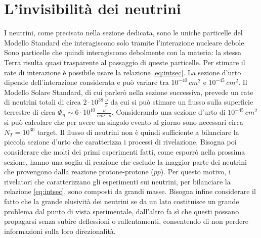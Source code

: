 \section{L'invisibilità dei neutrini}
I neutrini, come precisato nella sezione dedicata, sono le uniche particelle del Modello Standard che interagiscono solo tramite l'interazione nucleare debole. Sono particelle che quindi interagiscono debolmente con la materia: la stessa Terra risulta quasi trasparente al passaggio di queste particelle. Per stimare il rate di interazione è possibile usare la relazione \ref{eq:intsec}. La sezione d'urto dipende dell'interazione considerata e può variare tra $10^{-40}\,\unit{cm}^2$ e $10^{-45}\,\unit{cm}^2$. Il Modello Solare Standard, di cui parlerò nella sezione successiva, prevede un rate di neutrini totali di circa $2\cdot10^{38}\,\frac{\nu}{\unit{s}}$ da cui si può stimare un flusso sulla superficie terrestre di circa $\Phi_n\sim6\cdot10^{10}\,\frac{\nu}{\unit{cm}^2\cdot \unit{s}}$. Considerando una sezione d'urto di $10^{-45}\,\unit{cm^2}$ si può calcolare che per avere un singolo evento al giorno sono necessari circa $N_T=10^{30}$ target. Il flusso di neutrini non è quindi sufficiente a bilanciare la piccola sezione d'urto che caratterizza i processi di rivelazione. Bisogna poi considerare che molti dei primi esperimenti fatti, come esporrò nella prossima sezione, hanno una soglia di reazione che esclude la maggior parte dei neutrini che provengono dalla reazione protone-protone ($pp$). Per questo motivo, i rivelatori che caratterizzano gli esperimenti sui neutrini, per bilanciare la relazione \ref{eq:intsec}, sono composti da grandi masse. Bisogna infine considerare il fatto che la grande elusività dei neutrini se da un lato costituisce un grande problema dal punto di vista sperimentale, dall'altro fa sì che questi possano propagarsi senza subire deflessioni o rallentamenti,  consentendo di non perdere informazioni sulla loro direzionalità.


